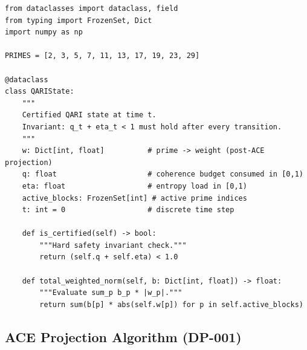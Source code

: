 \documentclass[12pt,letterpaper]{article}
\begin{document}
\begin{lstlisting}[caption={QARIState: Prime-indexed AGI state container},
                   label={lst:qaristate}]
from dataclasses import dataclass, field
from typing import FrozenSet, Dict
import numpy as np

PRIMES = [2, 3, 5, 7, 11, 13, 17, 19, 23, 29]

@dataclass
class QARIState:
    """
    Certified QARI state at time t.
    Invariant: q_t + eta_t < 1 must hold after every transition.
    """
    w: Dict[int, float]          # prime -> weight (post-ACE projection)
    q: float                     # coherence budget consumed in [0,1)
    eta: float                   # entropy load in [0,1)
    active_blocks: FrozenSet[int] # active prime indices
    t: int = 0                   # discrete time step

    def is_certified(self) -> bool:
        """Hard safety invariant check."""
        return (self.q + self.eta) < 1.0

    def total_weighted_norm(self, b: Dict[int, float]) -> float:
        """Evaluate sum_p b_p * |w_p|."""
        return sum(b[p] * abs(self.w[p]) for p in self.active_blocks)
\end{lstlisting}

\subsection{ACE Projection Algorithm (DP-001)}
\end{document}
